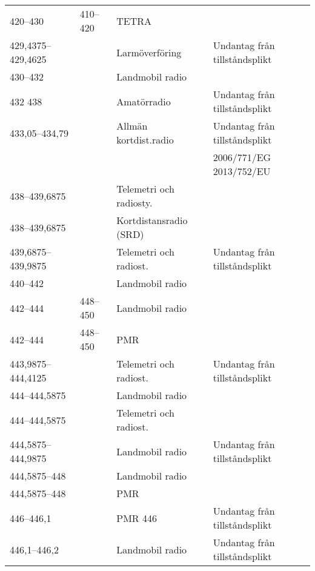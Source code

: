 \begin{landscape}
\begin{longtable}{llll}
	420--430           & 410--420           & TETRA                   &  \\
	429,4375--429,4625 &                    & Larmöverföring          & Undantag från tillståndsplikt            \\
	430--432           &                    & Landmobil radio         &  \\
	432	438            &                    & Amatörradio             & Undantag från tillståndsplikt            \\
	433,05--434,79     &                    & Allmän kortdist.radio   & Undantag från tillståndsplikt            \\
	                   &                    &                         & 2006/771/EG 2013/752/EU                  \\
	438--439,6875      &                    & Telemetri och radiosty. &  \\
	438--439,6875      &                    & Kortdistansradio (SRD)  &  \\
	439,6875--439,9875 &                    & Telemetri och radiost.  & Undantag från tillståndsplikt            \\
	440--442           &                    & Landmobil radio         &  \\
	442--444           & 448--450           & Landmobil radio         &  \\
	442--444           & 448--450           & PMR                     &  \\
	443,9875--444,4125 &                    & Telemetri och radiost.  & Undantag från tillståndsplikt            \\
	444--444,5875      &                    & Landmobil radio         &  \\
	444--444,5875      &                    & Telemetri och radiost.  &  \\
	444,5875--444,9875 &                    & Landmobil radio         & Undantag från tillståndsplikt            \\
	444,5875--448      &                    & Landmobil radio         &  \\
	444,5875--448      &                    & PMR                     &  \\
	446--446,1         &                    & PMR 446                 & Undantag från tillståndsplikt            \\
	446,1--446,2       &                    & Landmobil radio         & Undantag från tillståndsplikt            \\

\end{longtable}
\end{landscape}
